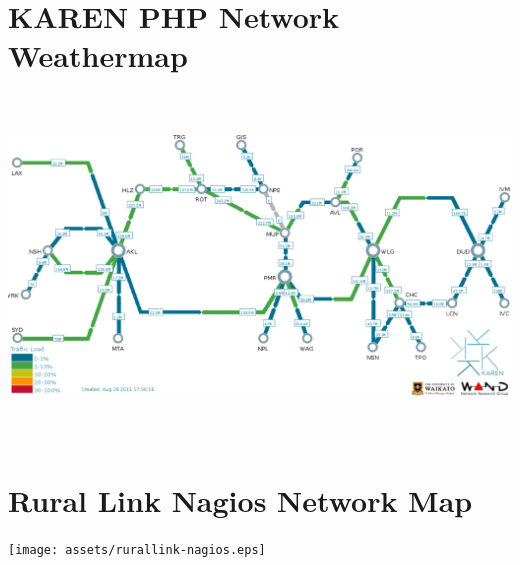 \documentclass[11pt, a4paper]{article}
\begin{document}
\newpage





\newpage

\appendix
\appendixpage

\section{KAREN PHP Network Weathermap}
\label{app:karenphp}
\centering
\includegraphics[width=170mm,height=90.76mm]{assets/karen-phpweathermap.eps}

\newpage

\section{Rural Link Nagios Network Map}
\label{app:crcnetnagios}
\centering
\texttt{[image: assets/rurallink-nagios.eps]}
\end{document}
